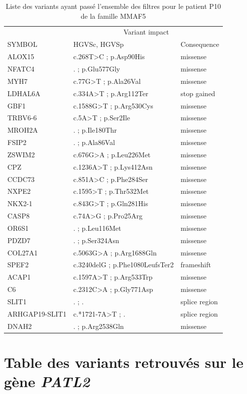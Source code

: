 \documentclass[12pt,a4paper,twoside]{ugathesis}
\theoremstyle{definition}
\theoremstyle{definition}
\theoremstyle{definition}
\theoremstyle{remark}
\begin{document}
\newpage

\begin{longtable}[t]{lll}
\caption{\label{tab:tabmmaf5}Liste des variants ayant passé l'ensemble des filtres pour le patient P10 de la famille MMAF5}\\
\toprule
\multicolumn{1}{c}{ } & \multicolumn{2}{c}{Variant impact} \\
\cmidrule(l{2pt}r{2pt}){2-3}
SYMBOL & HGVSc, HGVSp & Consequence\\
\midrule
ALOX15 & c.268T>C ; p.Asp90His & missense\\
NFATC4 & . ; p.Glu577Gly & missense\\
MYH7 & c.77G>T ; p.Ala26Val & missense\\
LDHAL6A & c.334A>T ; p.Arg112Ter & stop gained\\
GBF1 & c.1588G>T ; p.Arg530Cys & missense\\
\addlinespace
TRBV6-6 & c.5A>T ; p.Ser2Ile & missense\\
MROH2A & . ; p.Ile180Thr & missense\\
FSIP2 & . ; p.Ala86Val & missense\\
ZSWIM2 & c.676G>A ; p.Leu226Met & missense\\
CPZ & c.1236A>T ; p.Lys412Asn & missense\\
\addlinespace
CCDC73 & c.851A>C ; p.Phe284Ser & missense\\
NXPE2 & c.1595>T ; p.Thr532Met & missense\\
NKX2-1 & c.843G>T ; p.Gln281His & missense\\
CASP8 & c.74A>G ; p.Pro25Arg & missense\\
OR6S1 & . ; p.Leu116Met & missense\\
\addlinespace
PDZD7 & . ; p.Ser324Asn & missense\\
COL27A1 & c.5063G>A ; p.Arg1688Gln & missense\\
SPEF2 & c.3240delG ; p.Phe1080LeufsTer2 & frameshift\\
ACAP1 & c.1597A>T ; p.Arg533Trp & missense\\
C6 & c.2312C>A ; p.Gly771Asp & missense\\
\addlinespace
SLIT1 & . ; . & splice region\\
ARHGAP19-SLIT1 & c.*1721-7A>T ; . & splice region\\
DNAH2 & . ; p.Arg2538Gln & missense\\
\bottomrule
\end{longtable}

\chapter{\texorpdfstring{Table des variants retrouvés sur le gène
\emph{PATL2}}{Table des variants retrouvés sur le gène PATL2}}\label{table-des-variants-retrouves-sur-le-gene-patl2}
\end{document}
